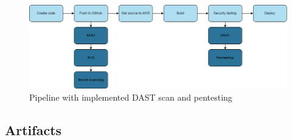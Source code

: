 \vspace{2mm}
\begin{figure}[H]
    \centering
    \includegraphics[width=0.8\columnwidth]{Images/pipeline5.png}
    \caption{Pipeline with implemented DAST scan and pentesting}
    \label{fig: Pipeline with implemented DAST scan and pentesting}
\end{figure}

\subsection{Artifacts}



